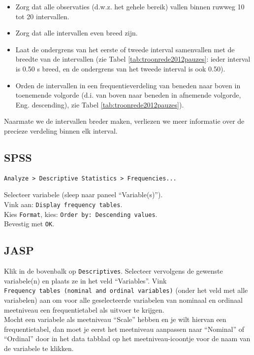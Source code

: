 \documentclass[
]{book}
\begin{document}
\begin{itemize}
\item
  Zorg dat alle observaties (d.w.z. het gehele bereik) vallen binnen
  ruwweg 10 tot 20 intervallen.
\item
  Zorg dat alle intervallen even breed zijn.
\item
  Laat de ondergrens van het eerste of tweede interval samenvallen met
  de breedte van de intervallen (zie
  Tabel \ref{tab:troonrede2012pauzes}: ieder interval is 0.50 s
  breed, en de ondergrens van het tweede interval is ook 0.50).
\item
  Orden de intervallen in een frequentieverdeling van beneden naar
  boven in toenemende volgorde (d.i. van boven naar beneden in
  afnemende volgorde, Eng. descending), zie
  Tabel \ref{tab:troonrede2012pauzes}).
\end{itemize}

Naarmate we de intervallen breder maken, verliezen we meer informatie
over de precieze verdeling binnen elk interval.

\subsection{SPSS}\label{spss-1}

\begin{verbatim}
Analyze > Descriptive Statistics > Frequencies...
\end{verbatim}

Selecteer variabele (sleep naar paneel ``Variable(s)'').\\
Vink aan: \texttt{Display\ frequency\ tables}.\\
Kies \texttt{Format}, kies: \texttt{Order\ by:\ Descending\ values}.\\
Bevestig met \texttt{OK}.\\

\subsection{JASP}\label{jasp-1}

Klik in de bovenbalk op \texttt{Descriptives}. Selecteer vervolgens de gewenste variabele(n) en plaats ze in het veld ``Variables''. Vink \texttt{Frequency\ tables\ (nominal\ and\ ordinal\ variables)} (onder het veld met alle variabelen) aan om voor alle geselecteerde variabelen van nominaal en ordinaal meetniveau een frequentietabel als uitvoer te krijgen.\\
Mocht een variabele als meetniveau ``Scale'' hebben en je wilt hiervan een frequentietabel, dan moet je eerst het meetniveau aanpassen naar ``Nominal'' of ``Ordinal'' door in het data tabblad op het meetniveau-icoontje voor de naam van de variabele te klikken.
\end{document}
